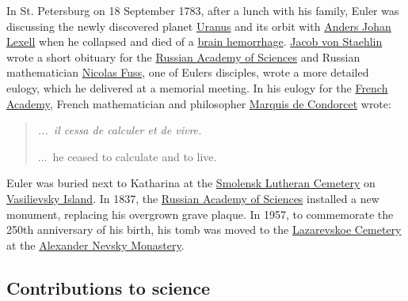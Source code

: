 In St. Petersburg on 18 September 1783, after a lunch with his family, Euler was discussing the newly discovered planet \href{https://en.wikipedia.org/wiki/Uranus}{Uranus} and its orbit with \href{https://en.wikipedia.org/wiki/Anders_Johan_Lexell}{Anders Johan Lexell} when he collapsed and died of a \href{https://en.wikipedia.org/wiki/Brain_hemorrhage}{brain hemorrhage}. \href{https://en.wikipedia.org/wiki/Jacob_von_Staehlin?action=edit&redlink=1}{Jacob von Staehlin} wrote a short obituary for the \href{https://en.wikipedia.org/wiki/Russian_Academy_of_Sciences}{Russian Academy of Sciences} and Russian mathematician \href{https://en.wikipedia.org/wiki/Nicolas_Fuss}{Nicolas Fuss}, one of Euler\textquotesingle s disciples, wrote a more detailed eulogy, which he delivered at a memorial meeting. In his eulogy for the \href{https://en.wikipedia.org/wiki/French_Academy_of_Sciences}{French Academy}, French mathematician and philosopher \href{https://en.wikipedia.org/wiki/Marquis_de_Condorcet}{Marquis de Condorcet} wrote:

\begin{quote}
{\emph{...{{~}}il cessa de calculer et de vivre.}}

...{{~}}he ceased to calculate and to live.
\end{quote}

Euler was buried next to Katharina at the \href{https://en.wikipedia.org/wiki/Smolensk_Lutheran_Cemetery}{Smolensk Lutheran Cemetery} on \href{https://en.wikipedia.org/wiki/Vasilievsky_Island}{Vasilievsky Island}. In 1837, the \href{https://en.wikipedia.org/wiki/Russian_Academy_of_Sciences}{Russian Academy of Sciences} installed a new monument, replacing his overgrown grave plaque. In 1957, to commemorate the 250th anniversary of his birth, his tomb was moved to the \href{https://en.wikipedia.org/wiki/Lazarevskoe_Cemetery}{Lazarevskoe Cemetery} at the \href{https://en.wikipedia.org/wiki/Alexander_Nevsky_Monastery}{Alexander Nevsky Monastery}.


\subsection{Contributions to science}\label{Contributions_to_science}

{
}

